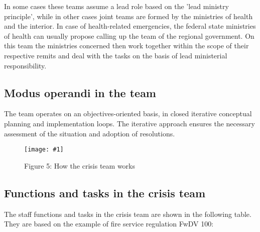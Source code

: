 \documentclass{article}
\newlength{\imgwidth}
\newcommand\scaledgraphics[2]{%
                
\settowidth{\imgwidth}{\texttt{[image: \#1]}}%
                
\setlength{\imgwidth}{\minof{\imgwidth}{#2\textwidth}}%
                
\texttt{[image: \#1]}%
                
}
\begin{document}
In some cases these teams assume a lead role based on the 'lead ministry principle', while in other cases joint teams are formed by the ministries of health and the interior. In case of health-related emergencies, the federal state ministries of health can usually propose calling up the team of the regional government. On this team the ministries concerned then work together within the scope of their respective remits and deal with the tasks on the basis of lead ministerial responsibility.


\subsection{Modus operandi in the team}\label{H7603496}



The team operates on an objectives-oriented basis, in closed iterative conceptual planning and implementation loops. The iterative approach ensures the necessary assessment of the situation and adoption of resolutions.

\begin{figure}
\scaledgraphics{9383dba6-bfb1-4174-9c5d-226b568d1898.png}{1}
\caption*{Figure 5: How the crisis team works}\label{F77300271}
\end{figure}


\emph{\textbf{ }}


\subsection{Functions and tasks in the crisis team}\label{H1128570}



The staff functions and tasks in the crisis team are shown in the following table. They are based on the example of fire service regulation FwDV 100:
\end{document}
